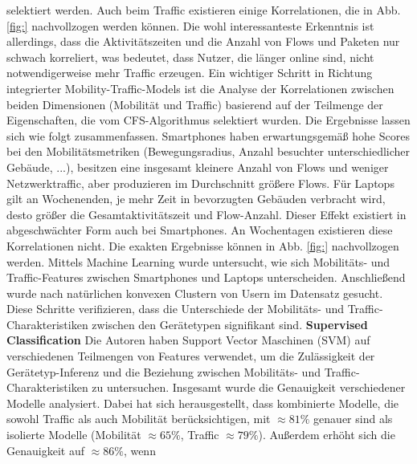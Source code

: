 \documentclass[12pt, a4paper]{article}
\begin{document}
selektiert werden. Auch beim Traffic existieren einige Korrelationen, die in Abb. \ref{fig:} nachvollzogen werden können.
Die wohl interessanteste Erkenntnis ist allerdings, dass die Aktivitätszeiten und die Anzahl von Flows und Paketen nur
schwach korreliert, was bedeutet, dass Nutzer, die länger online sind, nicht notwendigerweise mehr Traffic erzeugen. \cite{Alipour2018}
\newline\newline
Ein wichtiger Schritt in Richtung integrierter Mobility-Traffic-Models ist die Analyse der Korrelationen
zwischen beiden Dimensionen (Mobilität und Traffic) basierend auf der Teilmenge der Eigenschaften,
die vom \textsc{CFS}-Algorithmus selektiert wurden.\newline
Die Ergebnisse lassen sich wie folgt zusammenfassen. Smartphones haben erwartungsgemäß hohe Scores bei den Mobilitätsmetriken (Bewegungsradius,
Anzahl besuchter unterschiedlicher Gebäude, ...), besitzen eine
insgesamt kleinere Anzahl von Flows und weniger Netzwerktraffic, aber produzieren im Durchschnitt größere Flows.
Für Laptops gilt an Wochenenden, je mehr Zeit in bevorzugten Gebäuden verbracht wird, desto größer die Gesamtaktivitätszeit
und Flow-Anzahl. Dieser Effekt existiert in abgeschwächter Form auch bei Smartphones. 
An Wochentagen existieren diese Korrelationen nicht.\newline
Die exakten Ergebnisse können in Abb. \ref{fig:} nachvollzogen werden.
\newline\newline
Mittels Machine Learning wurde untersucht, wie sich Mobilitäts- und Traffic-Features zwischen
Smartphones und Laptops unterscheiden. Anschließend wurde nach natürlichen konvexen Clustern von Usern im
Datensatz gesucht. Diese Schritte verifizieren, dass die Unterschiede der Mobilitäts- und Traffic-Charakteristiken
zwischen den Gerätetypen signifikant sind.
\newline\newline
\textbf{Supervised Classification}\newline
Die Autoren haben Support Vector Maschinen (SVM) auf verschiedenen Teilmengen von Features
verwendet, um die Zulässigkeit der Gerätetyp-Inferenz und die Beziehung zwischen Mobilitäts- und Traffic-Charakteristiken
zu untersuchen. Insgesamt wurde die Genauigkeit verschiedener Modelle analysiert. Dabei hat sich herausgestellt,
dass kombinierte Modelle, die sowohl Traffic als auch Mobilität berücksichtigen, mit $\approx 81 \%$ genauer sind als isolierte Modelle
(Mobilität $\approx 65 \%$, Traffic $\approx 79 \%$). Außerdem erhöht sich die Genauigkeit auf $\approx 86 \%$, wenn
\end{document}
